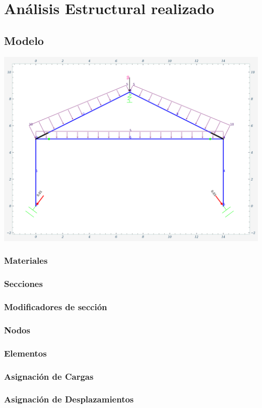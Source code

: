 
\chapter{Análisis Estructural realizado}


\section{Modelo}
\includegraphics[width=1\textwidth]{img/modelo.png}
\subsection{Materiales}
\subsection{Secciones}
\subsection{Modificadores de sección}
\subsection{Nodos}
\subsection{Elementos}
\subsection{Asignación de Cargas}
\subsection{Asignación de Desplazamientos}
